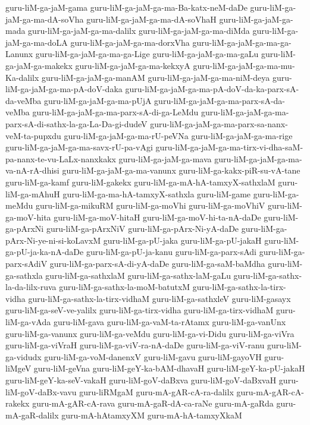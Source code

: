 {guru-liM-ga-jaM-gama
guru-liM-ga-jaM-ga-ma-Ba-katx-neM-daDe
guru-liM-ga-jaM-ga-ma-dA-soVha
guru-liM-ga-jaM-ga-ma-dA-soVhaH
guru-liM-ga-jaM-ga-mada
guru-liM-ga-jaM-ga-ma-dalilx
guru-liM-ga-jaM-ga-ma-diMda
guru-liM-ga-jaM-ga-ma-doLA
guru-liM-ga-jaM-ga-ma-dorxVha
guru-liM-ga-jaM-ga-ma-ga-Lanunx
guru-liM-ga-jaM-ga-ma-ga-Lige
guru-liM-ga-jaM-ga-ma-gaLu
guru-liM-ga-jaM-ga-makekx
guru-liM-ga-jaM-ga-ma-kekxyA
guru-liM-ga-jaM-ga-ma-mu-Ka-dalilx
guru-liM-ga-jaM-ga-manAM
guru-liM-ga-jaM-ga-ma-niM-deya
guru-liM-ga-jaM-ga-ma-pA-doV-daka
guru-liM-ga-jaM-ga-ma-pA-doV-da-ka-parx-sA-da-veMba
guru-liM-ga-jaM-ga-ma-pUjA
guru-liM-ga-jaM-ga-ma-parx-sA-da-veMba
guru-liM-ga-jaM-ga-ma-parx-sA-di-ga-LeMdu
guru-liM-ga-jaM-ga-ma-parx-sA-di-sathx-la-ga-La-Da-gi-dudeV
guru-liM-ga-jaM-ga-ma-parx-sa-nanx-veM-ta-pupxdu
guru-liM-ga-jaM-ga-ma-rU-peVNa
guru-liM-ga-jaM-ga-ma-rige
guru-liM-ga-jaM-ga-ma-savx-rU-pa-vAgi
guru-liM-ga-jaM-ga-ma-tirx-vi-dha-saM-pa-nanx-te-vu-LaLx-nanxkakx
guru-liM-ga-jaM-ga-mava
guru-liM-ga-jaM-ga-ma-va-nA-rA-dhisi
guru-liM-ga-jaM-ga-ma-vanunx
guru-liM-ga-kakx-piR-su-vA-tane
guru-liM-ga-kamf
guru-liM-gakekx
guru-liM-ga-mA-hA-tamxyX-sathxlaM
guru-liM-ga-mAhuH
guru-liM-ga-ma-hA-tamxyX-sathxla
guru-liM-game
guru-liM-ga-meMdu
guru-liM-ga-mikuRM
guru-liM-ga-moVhi
guru-liM-ga-moVhiV
guru-liM-ga-moV-hita
guru-liM-ga-moV-hitaH
guru-liM-ga-moV-hi-ta-nA-daDe
guru-liM-ga-pArxNi
guru-liM-ga-pArxNiV
guru-liM-ga-pArx-Ni-yA-daDe
guru-liM-ga-pArx-Ni-ye-ni-si-koLavxM
guru-liM-ga-pU-jaka
guru-liM-ga-pU-jakaH
guru-liM-ga-pU-ja-ka-nA-daDe
guru-liM-ga-pU-ja-kanu
guru-liM-ga-parx-sAdi
guru-liM-ga-parx-sAdiV
guru-liM-ga-parx-sA-di-yA-daDe
guru-liM-ga-saM-baMdha
guru-liM-ga-sathxla
guru-liM-ga-sathxlaM
guru-liM-ga-sathx-laM-gaLu
guru-liM-ga-sathx-la-da-lilx-ruva
guru-liM-ga-sathx-la-moM-batutxM
guru-liM-ga-sathx-la-tirx-vidha
guru-liM-ga-sathx-la-tirx-vidhaM
guru-liM-ga-sathxleV
guru-liM-gasayx
guru-liM-ga-seV-ve-yalilx
guru-liM-ga-tirx-vidha
guru-liM-ga-tirx-vidhaM
guru-liM-ga-vAda
guru-liM-gava
guru-liM-ga-vaM-ta-rAtamx
guru-liM-ga-vanUnx
guru-liM-ga-vanunx
guru-liM-ga-veMdu
guru-liM-ga-vi-Didu
guru-liM-ga-viVra
guru-liM-ga-viVraH
guru-liM-ga-viV-ra-nA-daDe
guru-liM-ga-viV-ranu
guru-liM-ga-vidudx
guru-liM-ga-voM-danenxV
guru-liM-gavu
guru-liM-gayoVH
guru-liMgeV
guru-liM-geVna
guru-liM-geY-ka-bAM-dhavaH
guru-liM-geY-ka-pU-jakaH
guru-liM-geY-ka-seV-vakaH
guru-liM-goV-daBxva
guru-liM-goV-daBxvaH
guru-liM-goV-daBx-vavu
guru-liRMgaM
guru-mA-gAR-cA-ra-dalilx
guru-mA-gAR-cA-rakekx
guru-mA-gAR-cA-rava
guru-mA-gaR-dA-ca-raNe
guru-mA-gaRda
guru-mA-gaR-dalilx
guru-mA-hAtamxyXM
guru-mA-hA-tamxyXkaM
}
